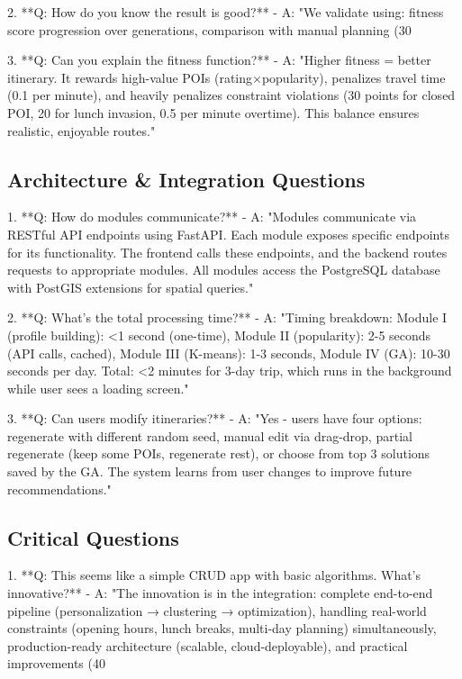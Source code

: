 \documentclass[12pt]{article}
\begin{document}
2. **Q: How do you know the result is good?**
   - A: "We validate using: fitness score progression over generations, comparison with manual planning (30%

3. **Q: Can you explain the fitness function?**
   - A: "Higher fitness = better itinerary. It rewards high-value POIs (rating×popularity), penalizes travel time (0.1 per minute), and heavily penalizes constraint violations (30 points for closed POI, 20 for lunch invasion, 0.5 per minute overtime). This balance ensures realistic, enjoyable routes."

\subsection{Architecture \& Integration Questions}
1. **Q: How do modules communicate?**
   - A: "Modules communicate via RESTful API endpoints using FastAPI. Each module exposes specific endpoints for its functionality. The frontend calls these endpoints, and the backend routes requests to appropriate modules. All modules access the PostgreSQL database with PostGIS extensions for spatial queries."

2. **Q: What's the total processing time?**
   - A: "Timing breakdown: Module I (profile building): <1 second (one-time), Module II (popularity): 2-5 seconds (API calls, cached), Module III (K-means): 1-3 seconds, Module IV (GA): 10-30 seconds per day. Total: <2 minutes for 3-day trip, which runs in the background while user sees a loading screen."

3. **Q: Can users modify itineraries?**
   - A: "Yes - users have four options: regenerate with different random seed, manual edit via drag-drop, partial regenerate (keep some POIs, regenerate rest), or choose from top 3 solutions saved by the GA. The system learns from user changes to improve future recommendations."

\subsection{Critical Questions}
1. **Q: This seems like a simple CRUD app with basic algorithms. What's innovative?**
   - A: "The innovation is in the integration: complete end-to-end pipeline (personalization → clustering → optimization), handling real-world constraints (opening hours, lunch breaks, multi-day planning) simultaneously, production-ready architecture (scalable, cloud-deployable), and practical improvements (40%
\end{document}
